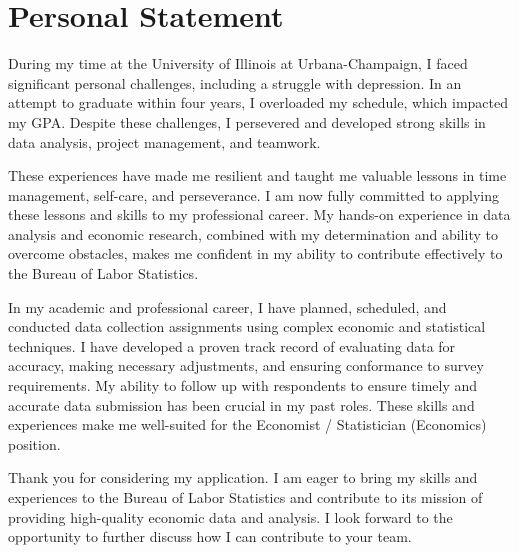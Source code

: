 \documentclass{article}
\begin{document}
\section*{Personal Statement}

During my time at the University of Illinois at Urbana-Champaign, I faced significant personal challenges, including a struggle with depression. In an attempt to graduate within four years, I overloaded my schedule, which impacted my GPA. Despite these challenges, I persevered and developed strong skills in data analysis, project management, and teamwork.

These experiences have made me resilient and taught me valuable lessons in time management, self-care, and perseverance. I am now fully committed to applying these lessons and skills to my professional career. My hands-on experience in data analysis and economic research, combined with my determination and ability to overcome obstacles, makes me confident in my ability to contribute effectively to the Bureau of Labor Statistics.

In my academic and professional career, I have planned, scheduled, and conducted data collection assignments using complex economic and statistical techniques. I have developed a proven track record of evaluating data for accuracy, making necessary adjustments, and ensuring conformance to survey requirements. My ability to follow up with respondents to ensure timely and accurate data submission has been crucial in my past roles. These skills and experiences make me well-suited for the Economist / Statistician (Economics) position.

Thank you for considering my application. I am eager to bring my skills and experiences to the Bureau of Labor Statistics and contribute to its mission of providing high-quality economic data and analysis. I look forward to the opportunity to further discuss how I can contribute to your team.
\end{document}
